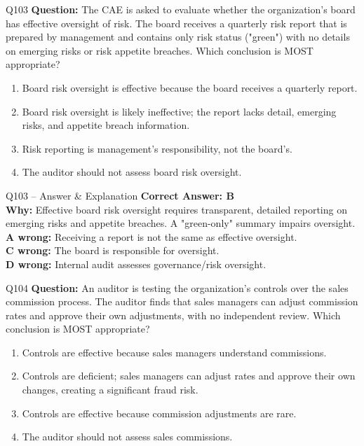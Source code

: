 \documentclass[aspectratio=169,10pt]{beamer}
\begin{document}
	\begin{frame}[t]{Q103}
		\small
		\textbf{Question:} The CAE is asked to evaluate whether the organization's board has effective oversight of risk. The board receives a quarterly risk report that is prepared by management and contains only risk status ("green") with no details on emerging risks or risk appetite breaches. Which conclusion is MOST appropriate?
		\begin{enumerate}[label=\Alph*.,itemsep=1pt,topsep=2pt]
			\item Board risk oversight is effective because the board receives a quarterly report.
			\item Board risk oversight is likely ineffective; the report lacks detail, emerging risks, and appetite breach information.
			\item Risk reporting is management's responsibility, not the board's.
			\item The auditor should not assess board risk oversight.
		\end{enumerate}
	\end{frame}
	
	\begin{frame}[t]{Q103 -- Answer \& Explanation}
		\small
		\textbf{Correct Answer: B} \\[4pt]
		\textbf{Why:} Effective board risk oversight requires transparent, detailed reporting on emerging risks and appetite breaches. A "green-only" summary impairs oversight. \\[4pt]
		\textbf{A wrong:} Receiving a report is not the same as effective oversight. \\[2pt]
		\textbf{C wrong:} The board is responsible for oversight. \\[2pt]
		\textbf{D wrong:} Internal audit assesses governance/risk oversight.
	\end{frame}
	
	\begin{frame}[t]{Q104}
		\small
		\textbf{Question:} An auditor is testing the organization's controls over the sales commission process. The auditor finds that sales managers can adjust commission rates and approve their own adjustments, with no independent review. Which conclusion is MOST appropriate?
		\begin{enumerate}[label=\Alph*.,itemsep=1pt,topsep=2pt]
			\item Controls are effective because sales managers understand commissions.
			\item Controls are deficient; sales managers can adjust rates and approve their own changes, creating a significant fraud risk.
			\item Controls are effective because commission adjustments are rare.
			\item The auditor should not assess sales commissions.
		\end{enumerate}
	\end{frame}
	
\end{document}
